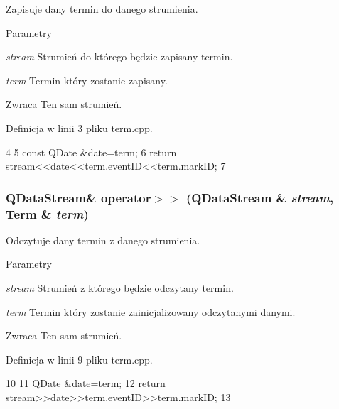 Zapisuje dany termin do danego strumienia. 


\begin{DoxyParams}{Parametry}
\item[{\em stream}]Strumień do którego będzie zapisany termin. \item[{\em term}]Termin który zostanie zapisany. \end{DoxyParams}
\begin{DoxyReturn}{Zwraca}
Ten sam strumień. 
\end{DoxyReturn}


Definicja w linii 3 pliku term.cpp.




\begin{DoxyCode}
4 {
5     const QDate &date=term;
6     return stream<<date<<term.eventID<<term.markID;
7 }
\end{DoxyCode}


\hypertarget{classTerm_ad3ecfcfe45e8df9b765a1b06be05a457}{
\subsubsection[{operator$>$$>$}]{\setlength{\rightskip}{0pt plus 5cm}QDataStream\& operator$>$$>$ (QDataStream \& {\em stream}, \/  {\bf Term} \& {\em term})}}
\label{classTerm_ad3ecfcfe45e8df9b765a1b06be05a457}


Odczytuje dany termin z danego strumienia. 


\begin{DoxyParams}{Parametry}
\item[{\em stream}]Strumień z którego będzie odczytany termin. \item[{\em term}]Termin który zostanie zainicjalizowany odczytanymi danymi. \end{DoxyParams}
\begin{DoxyReturn}{Zwraca}
Ten sam strumień. 
\end{DoxyReturn}


Definicja w linii 9 pliku term.cpp.




\begin{DoxyCode}
10 {
11     QDate &date=term;
12     return stream>>date>>term.eventID>>term.markID;
13 }
\end{DoxyCode}




